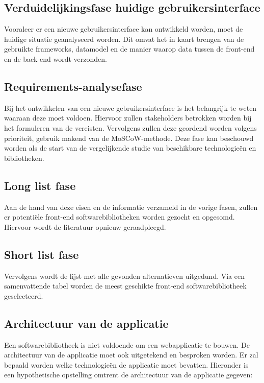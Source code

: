\subsection [Verduidelijkingsfase huidige situatie]{Verduidelijkingsfase huidige geb\-ruikersinterface}
Vooraleer er een nieuwe gebruikersinterface kan ontwikkeld worden, moet de huidige situatie geanalyseerd worden. Dit omvat het in kaart brengen van de gebruikte frameworks, datamodel en de manier waarop data tussen de front-end en de back-end wordt verzonden.

\subsection{Requirements-analysefase}
Bij het ontwikkelen van een nieuwe gebruikersinterface is het belangrijk te weten waaraan deze moet voldoen. Hiervoor zullen stakeholders betrokken worden bij het formuleren van de vereisten. Vervolgens zullen deze geordend worden volgens prioriteit, gebruik makend van de MoSCoW-methode. Deze fase kan beschouwd worden als de start van de vergelijken\-de studie van beschikbare technologieën en bibliotheken.

\subsection {Long list fase}
Aan de hand van deze eisen en de informatie verzameld in de vorige fasen, zullen er potentiële front-end softwarebibliotheken worden gezocht en opgesomd. Hiervoor wordt de literatuur opnieuw geraadpleegd.

\subsection {Short list fase}
Vervolgens wordt de lijst met alle gevonden alternatieven uitgedund. Via een samenvattende tabel worden de meest geschikte front-end softwarebibliotheek geselecteerd.

\subsection{Architectuur van de applicatie}
Een softwarebibliotheek is niet voldoende om een webapplicatie te bouwen. De architectuur van de applicatie moet ook uitgetekend en besproken worden. Er zal bepaald worden welke technologieën de applicatie moet bevatten. Hieronder is een hypothetische opstelling omtrent de architectuur van de applicatie gegeven:

